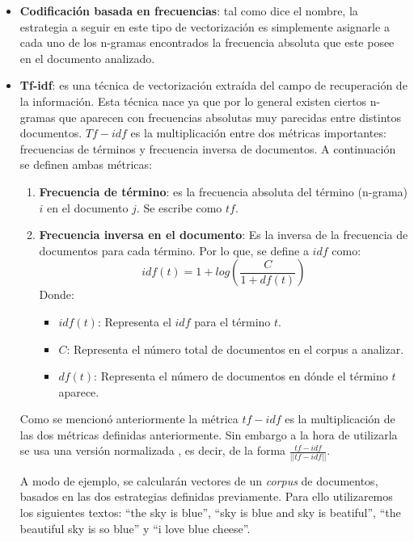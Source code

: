     \begin{itemize}
        \item \textbf{Codificación basada en frecuencias}: tal como dice el nombre, la estrategia a seguir en este tipo de vectorización es simplemente asignarle a cada uno de los n-gramas encontrados la frecuencia absoluta que este posee en el documento analizado.
        \item \textbf{Tf-idf}: es una técnica de vectorización extraída del campo de recuperación de la información. Esta técnica nace ya que por lo general existen ciertos n-gramas que aparecen con frecuencias absolutas muy parecidas entre distintos documentos. $Tf-idf$ es la multiplicación entre dos métricas importantes: frecuencias de términos y frecuencia inversa de documentos. A continuación se definen ambas métricas:
        \begin{enumerate}
            \item \textbf{Frecuencia de término}: es la frecuencia absoluta del término (n-grama) $i$ en el documento $j$. Se escribe como $tf$.
            \item \textbf{Frecuencia inversa en el documento}: Es la inversa de la frecuencia de documentos para cada término. Por lo que, se define a $idf$ como:
            \begin{equation*}
                idf(t) = 1+ log \left(\frac{C}{1+df(t)}\right)
            \end{equation*}
            Donde:
            \begin{itemize}
                \item $idf(t)$: Representa el $idf$ para el término $t$.
                \item $C$: Representa el número total de documentos en el corpus a analizar.
                \item $df(t)$: Representa el número de documentos en dónde el término $t$ aparece.
            \end{itemize}
    \end{enumerate}
    Como se mencionó anteriormente la métrica $tf-idf$ es la multiplicación de las dos métricas definidas anteriormente. Sin embargo a la hora de utilizarla se usa una versión normalizada , es decir, de la forma $\frac{tf-idf}{||tf-idf||}$.
   
    A modo de ejemplo, se calcularán vectores de un \textit{corpus} de documentos, basados en las dos estrategias definidas previamente. Para ello utilizaremos los siguientes textos: ``the sky is blue'', ``sky is blue and sky is beatiful'', ``the beautiful sky is so blue'' y ``i love blue cheese''.
    

\end{itemize}
